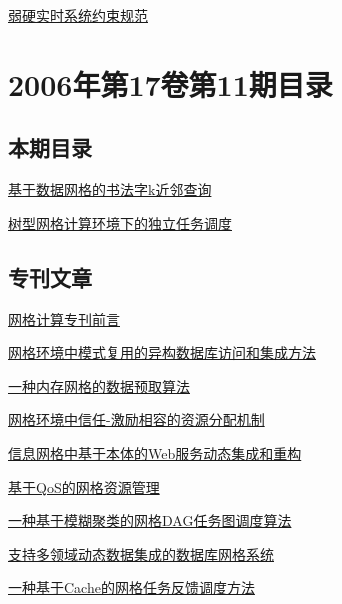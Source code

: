 \documentclass[a4paper]{article}
\begin{document}
\href{http://www.jos.org.cn/ch/reader/download_pdf.aspx?file_no=20061219&year_id=2006&quarter_id=12&falg=1}{弱硬实时系统约束规范}


\section{\textbf{2006年第17卷第11期目录}}
\subsection{本期目录}
\href{http://www.jos.org.cn/ch/reader/download_pdf.aspx?file_no=20061108&year_id=2006&quarter_id=11&falg=1}{基于数据网格的书法字k近邻查询}

\href{http://www.jos.org.cn/ch/reader/download_pdf.aspx?file_no=20061114&year_id=2006&quarter_id=11&falg=1}{树型网格计算环境下的独立任务调度}

\subsection{专刊文章}
\href{http://www.jos.org.cn/ch/reader/download_pdf.aspx?file_no=20061101&year_id=2006&quarter_id=11&falg=1}{网格计算专刊前言}

\href{http://www.jos.org.cn/ch/reader/download_pdf.aspx?file_no=20061102&year_id=2006&quarter_id=11&falg=1}{网格环境中模式复用的异构数据库访问和集成方法}

\href{http://www.jos.org.cn/ch/reader/download_pdf.aspx?file_no=20061103&year_id=2006&quarter_id=11&falg=1}{一种内存网格的数据预取算法}

\href{http://www.jos.org.cn/ch/reader/download_pdf.aspx?file_no=20061104&year_id=2006&quarter_id=11&falg=1}{网格环境中信任-激励相容的资源分配机制}

\href{http://www.jos.org.cn/ch/reader/download_pdf.aspx?file_no=20061105&year_id=2006&quarter_id=11&falg=1}{信息网格中基于本体的Web服务动态集成和重构}

\href{http://www.jos.org.cn/ch/reader/download_pdf.aspx?file_no=20061106&year_id=2006&quarter_id=11&falg=1}{基于QoS的网格资源管理}

\href{http://www.jos.org.cn/ch/reader/download_pdf.aspx?file_no=20061107&year_id=2006&quarter_id=11&falg=1}{一种基于模糊聚类的网格DAG任务图调度算法}

\href{http://www.jos.org.cn/ch/reader/download_pdf.aspx?file_no=20061109&year_id=2006&quarter_id=11&falg=1}{支持多领域动态数据集成的数据库网格系统}

\href{http://www.jos.org.cn/ch/reader/download_pdf.aspx?file_no=20061110&year_id=2006&quarter_id=11&falg=1}{一种基于Cache的网格任务反馈调度方法}
\end{document}
